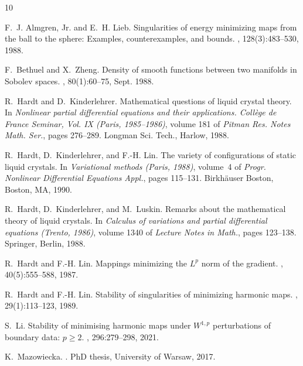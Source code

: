 \documentclass[12pt]{amsart}
\numberwithin{theorem}{section} \numberwithin{equation}{section}
\begin{document}
\begin{thebibliography}{10}
	
	F.~J. Almgren, Jr. and E.~H. Lieb.
	\newblock Singularities of energy minimizing maps from the ball to the sphere:
	{E}xamples, counterexamples, and bounds.
	, 128(3):483--530, 1988.
	
	F.~Bethuel and X.~Zheng.
	\newblock Density of smooth functions between two manifolds in {Sobolev}
	spaces.
	, 80(1):60--75, Sept. 1988.
	
	R.~Hardt and D.~Kinderlehrer.
	\newblock Mathematical questions of liquid crystal theory.
	\newblock In {\em Nonlinear partial differential equations and their
		applications. {C}oll\`ege de {F}rance {S}eminar, {V}ol. {IX} ({P}aris,
		1985--1986)}, volume 181 of {\em Pitman Res. Notes Math. Ser.}, pages
	276--289. Longman Sci. Tech., Harlow, 1988.
	
	R.~Hardt, D.~Kinderlehrer, and F.-H. Lin.
	\newblock The variety of configurations of static liquid crystals.
	\newblock In {\em Variational methods ({P}aris, 1988)}, volume~4 of {\em Progr.
		Nonlinear Differential Equations Appl.}, pages 115--131. Birkh\"{a}user
	Boston, Boston, MA, 1990.
	
	R.~Hardt, D.~Kinderlehrer, and M.~Luskin.
	\newblock Remarks about the mathematical theory of liquid crystals.
	\newblock In {\em Calculus of variations and partial differential equations
		({T}rento, 1986)}, volume 1340 of {\em Lecture Notes in Math.}, pages
	123--138. Springer, Berlin, 1988.
	
	R.~Hardt and F.-H. Lin.
	\newblock Mappings minimizing the {$L^p$} norm of the gradient.
	, 40(5):555--588, 1987.
	
	R.~Hardt and F.-H. Lin.
	\newblock Stability of singularities of minimizing harmonic maps.
	, 29(1):113--123, 1989.
	
	S.~Li.
	\newblock Stability of minimising harmonic maps under {$W^{1,p}$} perturbations
	of boundary data: {$p\geq2$}.
	, 296:279--298, 2021.
	
	K.~Mazowiecka.
	.
	\newblock PhD thesis, University of Warsaw, 2017.
	

\end{thebibliography}
\end{document}
